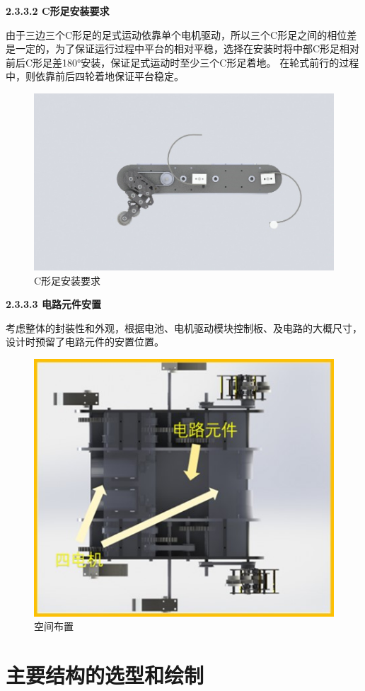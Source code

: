 \documentclass[12pt]{article}
\begin{document}
\begin{CJK}{UTF8}{song}
\textbf{2.3.3.2	C形足安装要求}\par
由于三边三个C形足的足式运动依靠单个电机驱动，所以三个C形足之间的相位差是一定的，为了保证运行过程中平台的相对平稳，选择在安装时将中部C形足相对前后C形足差180°安装，保证足式运动时至少三个C形足着地。
    在轮式前行的过程中，则依靠前后四轮着地保证平台稳定。
 \begin{figure}[H]
\centering
\includegraphics[width=.65\textwidth]{chap2//fig23.jpg}
\caption{C形足安装要求}
\end{figure}

\textbf{2.3.3.3	电路元件安置}\par
考虑整体的封装性和外观，根据电池、电机驱动模块控制板、及电路的大概尺寸，设计时预留了电路元件的安置位置。
 \begin{figure}[H]
\centering
\includegraphics[width=.55\textwidth]{chap2//fig24.jpg}
\caption{空间布置}
\end{figure}


\section{主要结构的选型和绘制}


\end{CJK}
\end{document}
